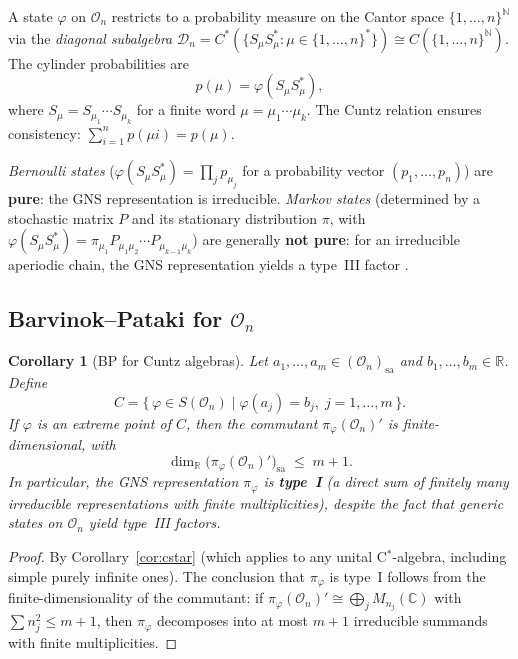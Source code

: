\documentclass[11pt,a4paper]{article}
\newtheorem{corollary}[theorem]{Corollary}
\theoremstyle{definition}
\newcommand{\R}{\mathbb{R}}
\newcommand{\sa}{\mathrm{sa}}
\begin{document}
A state $\varphi$ on $\mathcal{O}_n$ restricts to a probability
measure on the Cantor space $\{1, \ldots, n\}^{\mathbb{N}}$ via
the \emph{diagonal subalgebra}
$\mathcal{D}_n = C^*(\{S_\mu S_\mu^* : \mu \in \{1,\ldots,n\}^*\})
\cong C(\{1,\ldots,n\}^{\mathbb{N}})$.
The cylinder probabilities are
\[
  p(\mu) = \varphi(S_\mu S_\mu^*),
\]
where $S_\mu = S_{\mu_1} \cdots S_{\mu_k}$ for a finite word
$\mu = \mu_1 \cdots \mu_k$.  The Cuntz relation ensures consistency:
$\sum_{i=1}^n p(\mu i) = p(\mu)$.

\emph{Bernoulli states} ($\varphi(S_\mu S_\mu^*) =
\prod_j p_{\mu_j}$ for a probability vector $(p_1, \ldots, p_n)$)
are \textbf{pure}: the GNS representation is irreducible.  \emph{Markov
states} (determined by a stochastic matrix $P$ and its stationary
distribution $\pi$, with
$\varphi(S_\mu S_\mu^*) = \pi_{\mu_1} P_{\mu_1\mu_2} \cdots
P_{\mu_{k-1}\mu_k}$) are generally \textbf{not pure}: for an
irreducible aperiodic chain, the GNS representation yields a
type~III factor \cite{bratteli_jorgensen99}.

\subsection{Barvinok--Pataki for $\mathcal{O}_n$}

\begin{corollary}[BP for Cuntz algebras]\label{cor:cuntz-bp}
Let $a_1, \ldots, a_m \in (\mathcal{O}_n)_\sa$ and
$b_1, \ldots, b_m \in \R$.  Define
\[
  C = \bigl\{\, \varphi \in S(\mathcal{O}_n) \;\big|\;
    \varphi(a_j) = b_j,\; j = 1, \ldots, m \,\bigr\}.
\]
If $\varphi$ is an extreme point of $C$, then the commutant
$\pi_\varphi(\mathcal{O}_n)'$ is finite-dimensional, with
\[
  \dim_\R\bigl(\pi_\varphi(\mathcal{O}_n)'\bigr)_\sa
  \;\leq\; m + 1.
\]
In particular, the GNS representation $\pi_\varphi$ is
\textbf{type~I} (a direct sum of finitely many irreducible
representations with finite multiplicities), despite the fact
that generic states on $\mathcal{O}_n$ yield type~III factors.
\end{corollary}

\begin{proof}
By Corollary~\ref{cor:cstar} (which applies to any unital
C$^*$-algebra, including simple purely infinite ones).  The
conclusion that $\pi_\varphi$ is type~I follows from the
finite-dimensionality of the commutant: if
$\pi_\varphi(\mathcal{O}_n)' \cong \bigoplus_j M_{n_j}(\mathbb{C})$
with $\sum n_j^2 \leq m + 1$, then $\pi_\varphi$ decomposes
into at most $m + 1$ irreducible summands with finite multiplicities.
\end{proof}
\end{document}
